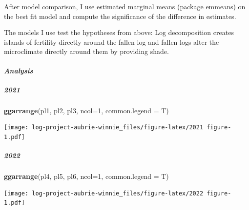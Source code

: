 \documentclass[
]{article}
\newenvironment{Shaded}{\begin{snugshade}}{\end{snugshade}}
\newcommand{\AttributeTok}[1]{\textcolor[rgb]{0.13,0.29,0.53}{#1}}
\newcommand{\DecValTok}[1]{\textcolor[rgb]{0.00,0.00,0.81}{#1}}
\newcommand{\FunctionTok}[1]{\textcolor[rgb]{0.13,0.29,0.53}{\textbf{#1}}}
\newcommand{\NormalTok}[1]{#1}
\begin{document}
After model comparison, I use estimated marginal means (package emmeans)
on the best fit model and compute the significance of the difference in
estimates.

The models I use test the hypotheses from above: Log decomposition
creates islands of fertility directly around the fallen log and fallen
logs alter the microclimate directly around them by providing shade.

\hypertarget{analysis-2}{%
\paragraph{\texorpdfstring{\emph{Analysis}}{Analysis }}\label{analysis-2}}

\hypertarget{section}{%
\subparagraph{\texorpdfstring{\textbf{2021}}{2021}}\label{section}}

\begin{Shaded}
\begin{Highlighting}[]
\FunctionTok{ggarrange}\NormalTok{(pl1, pl2, pl3, }\AttributeTok{ncol=}\DecValTok{1}\NormalTok{, }\AttributeTok{common.legend =}\NormalTok{ T)}
\end{Highlighting}
\end{Shaded}

\texttt{[image: log-project-aubrie-winnie\_files/figure-latex/2021 figure-1.pdf]}

\hypertarget{section-1}{%
\subparagraph{\texorpdfstring{\textbf{2022}}{2022}}\label{section-1}}

\begin{Shaded}
\begin{Highlighting}[]
\FunctionTok{ggarrange}\NormalTok{(pl4, pl5, pl6, }\AttributeTok{ncol=}\DecValTok{1}\NormalTok{, }\AttributeTok{common.legend =}\NormalTok{ T)}
\end{Highlighting}
\end{Shaded}

\texttt{[image: log-project-aubrie-winnie\_files/figure-latex/2022 figure-1.pdf]}
\end{document}

